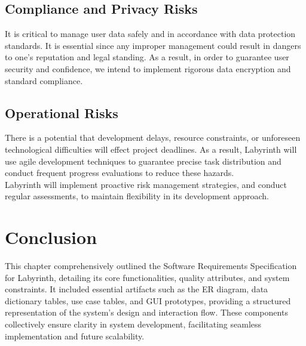 \documentclass{FastFyp}
\begin{document}
\subsection{Compliance and Privacy Risks}
It is critical to manage user data safely and in accordance with data protection standards.  It is essential since any improper management could result in dangers to one's reputation and legal standing.  As a result, in order to guarantee user security and confidence, we intend to implement rigorous data encryption and standard compliance.
\subsection{Operational Risks}
There is a potential that development delays, resource constraints, or unforeseen technological difficulties will effect project deadlines.  As a result, Labyrinth will use agile development techniques to guarantee precise task distribution and conduct frequent progress evaluations to reduce these hazards. \\ 
Labyrinth will implement proactive risk management strategies, and conduct regular assessments, to maintain flexibility in its development approach.
\section{Conclusion}
This chapter comprehensively outlined the Software Requirements Specification for Labyrinth, detailing its core functionalities, quality attributes, and system constraints. It included essential artifacts such as the ER diagram, data dictionary tables, use case tables, and GUI prototypes, providing a structured representation of the system's design and interaction flow. These components collectively ensure clarity in system development, facilitating seamless implementation and future scalability.
\end{document}
